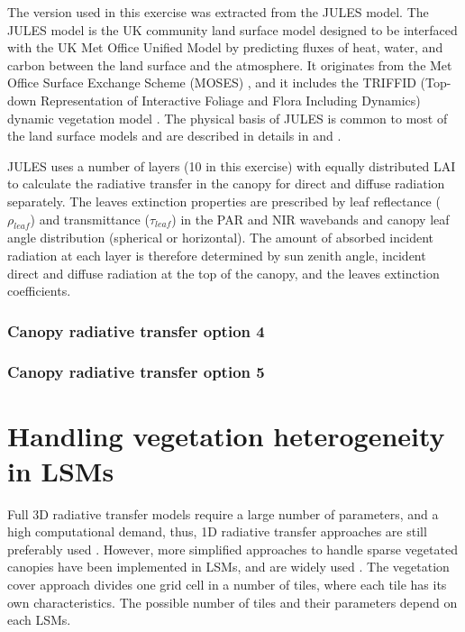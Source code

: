The version used in this exercise was extracted from the JULES model. The JULES model is the UK community land surface model designed to be interfaced with the UK Met Office Unified Model \citep{Walters2014} by predicting fluxes of heat, water, and carbon between the land surface and the atmosphere. It originates from the Met Office Surface Exchange Scheme (MOSES) \citep{Cox1999}, and it includes the TRIFFID (Top-down Representation of Interactive Foliage and Flora Including Dynamics) dynamic vegetation model \citep{Cox2001}. The physical basis of JULES is common to most of the land surface models and are described in details in \citet{Best2011} and \citet{Clark2011}.

JULES uses a number of layers (10 in this exercise) with equally distributed LAI to calculate the radiative transfer in the canopy for direct and diffuse radiation separately. The leaves extinction properties are prescribed by leaf reflectance ($\rho_{leaf}$) and transmittance ($\tau_{leaf}$) in the PAR and NIR wavebands and canopy leaf angle distribution (spherical or horizontal). The amount of absorbed incident radiation at each layer is therefore determined by sun zenith angle, incident direct and diffuse radiation at the top of the canopy, and the leaves extinction coefficients.

\subsubsection{Canopy radiative transfer option 4}

\subsubsection{Canopy radiative transfer option 5}

\section{Handling vegetation heterogeneity in LSMs}
Full 3D radiative transfer models require a large number of parameters, and a high computational demand, thus, 1D radiative transfer approaches are still preferably used \citep{yang2003,loew2014}. However, more simplified approaches to handle sparse vegetated canopies have been implemented in LSMs, and are widely used \citep{loew2014}. The vegetation cover approach divides one grid cell in a number of tiles, where each tile has its own characteristics. The possible number of tiles and their parameters depend on each LSMs.

